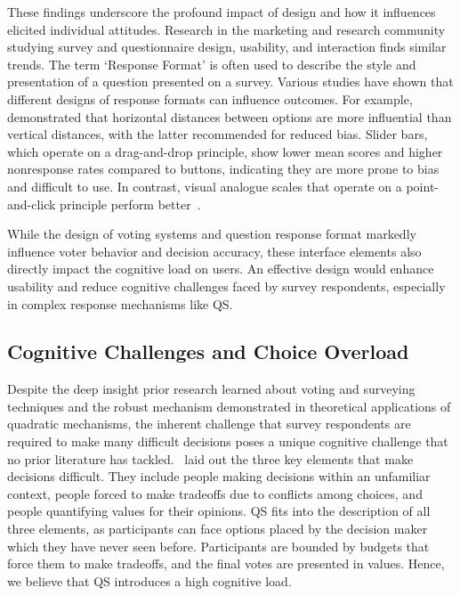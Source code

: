 These findings underscore the profound impact of design and how it influences elicited individual attitudes. Research in the marketing and research community studying survey and questionnaire design, usability, and interaction finds similar trends. The term `Response Format' is often used to describe the style and presentation of a question presented on a survey. Various studies have shown that different designs of response formats can influence outcomes. For example, \textcite{weijtersExtremityHorizontalVertical2021} demonstrated that horizontal distances between options are more influential than vertical distances, with the latter recommended for reduced bias. Slider bars, which operate on a drag-and-drop principle, show lower mean scores and higher nonresponse rates compared to buttons, indicating they are more prone to bias and difficult to use. In contrast, visual analogue scales that operate on a point-and-click principle perform better~\cite{toepoelSlidersVisualAnalogue2018}. 

While the design of voting systems and question response format markedly influence voter behavior and decision accuracy, these interface elements also directly impact the cognitive load on users. An effective design would enhance usability and reduce cognitive challenges faced by survey respondents, especially in complex response mechanisms like QS.

\subsection{Cognitive Challenges and Choice Overload}
Despite the deep insight prior research learned about voting and surveying techniques and the robust mechanism demonstrated in theoretical applications of quadratic mechanisms, the inherent challenge that survey respondents are required to make many difficult decisions poses a unique cognitive challenge that no prior literature has tackled.~\textcite{lichtensteinConstructionPreference2006} laid out the three key elements that make decisions difficult. They include people making decisions within an unfamiliar context, people forced to make tradeoffs due to conflicts among choices, and people quantifying values for their opinions. QS fits into the description of all three elements, as participants can face options placed by the decision maker which they have never seen before. Participants are bounded by budgets that force them to make tradeoffs, and the final votes are presented in values. Hence, we believe that QS introduces a high cognitive load.

